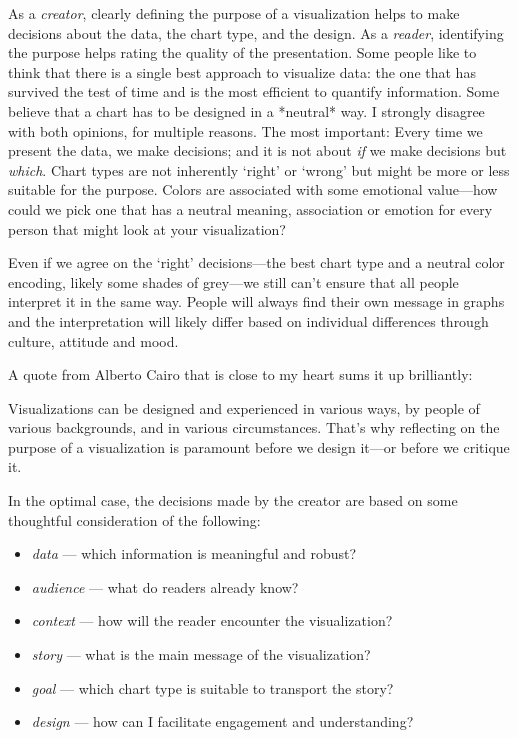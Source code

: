 \documentclass[
]{krantz}
\providecommand{\tightlist}{%
  \setlength{\itemsep}{0pt}\setlength{\parskip}{0pt}}
\renewenvironment{quote}{\begin{VF}}{\end{VF}}
\begin{document}
As a \emph{creator}, clearly defining the purpose of a visualization helps to make decisions about the data, the chart type, and the design. As a \emph{reader}, identifying the purpose helps rating the quality of the presentation. Some people like to think that there is a single best approach to visualize data: the one that has survived the test of time and is the most efficient to quantify information. Some believe that a chart has to be designed in a *neutral* way. I strongly disagree with both opinions, for multiple reasons. The most important: Every time we present the data, we make decisions; and it is not about \emph{if} we make decisions but \emph{which}. Chart types are not inherently `right' or `wrong' but might be more or less suitable for the purpose. Colors are associated with some emotional value---how could we pick one that has a neutral meaning, association or emotion for every person that might look at your visualization?

Even if we agree on the `right' decisions---the best chart type and a neutral color encoding, likely some shades of grey---we still can't ensure that all people interpret it in the same way. People will always find their own message in graphs and the interpretation will likely differ based on individual differences through culture, attitude and mood.

A quote from Alberto Cairo that is close to my heart sums it up brilliantly:

\begin{quote}
Visualizations can be designed and experienced in various ways, by people of various backgrounds, and in various circumstances. That's why reflecting on the purpose of a visualization is paramount before we design it---or before we critique it. \citep{cairo2021}
\end{quote}

In the optimal case, the decisions made by the creator are based on some thoughtful consideration of the following:

\begin{itemize}
\tightlist
\item
  \emph{data} --- which information is meaningful and robust?
\item
  \emph{audience} --- what do readers already know?
\item
  \emph{context} --- how will the reader encounter the visualization?
\item
  \emph{story} --- what is the main message of the visualization?
\item
  \emph{goal} --- which chart type is suitable to transport the story?
\item
  \emph{design} --- how can I facilitate engagement and understanding?
\end{itemize}
\end{document}
